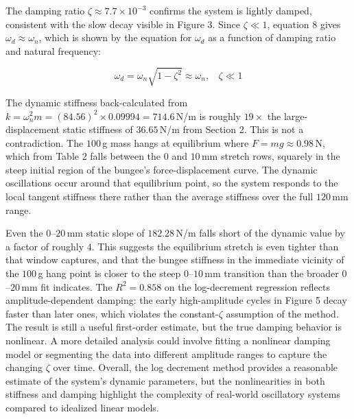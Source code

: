 \documentclass{article}
\begin{document}
The damping ratio $\zeta \approx 7.7 \times 10^{-3}$ confirms the system is lightly damped, consistent with the slow decay visible in Figure 3. Since $\zeta \ll 1$, equation 8 gives $\omega_d \approx \omega_n$, which is shown by the equation for $\omega_d$ as a function of damping ratio and natural frequency:

\begin{equation}
    \omega_d = \omega_n\sqrt{1-\zeta^2} \approx \omega_n,\:\:\:\:\zeta \ll 1
\end{equation}

\noindent The dynamic stiffness back-calculated from $k = \omega_n^2 m = (84.56)^2 \times 0.09994 = 714.6$\,N/m is roughly $19\times$ the large-displacement static stiffness of $36.65$\,N/m from Section 2. This is not a contradiction. The $100$\,g mass hangs at equilibrium where $F = mg \approx 0.98$\,N, which from Table 2 falls between the $0$ and $10$\,mm stretch rows, squarely in the steep initial region of the bungee's force-displacement curve. The dynamic oscillations occur around that equilibrium point, so the system responds to the local tangent stiffness there rather than the average stiffness over the full $120$\,mm range.

Even the $0$--$20$\,mm static slope of $182.28$\,N/m falls short of the dynamic value by a factor of roughly $4$. This suggests the equilibrium stretch is even tighter than that window captures, and that the bungee stiffness in the immediate vicinity of the $100$\,g hang point is closer to the steep $0$--$10$\,mm transition than the broader $0$--$20$\,mm fit indicates. The $R^2 = 0.858$ on the log-decrement regression reflects amplitude-dependent damping: the early high-amplitude cycles in Figure 5 decay faster than later ones, which violates the constant-$\zeta$ assumption of the method. The result is still a useful first-order estimate, but the true damping behavior is nonlinear. A more detailed analysis could involve fitting a nonlinear damping model or segmenting the data into different amplitude ranges to capture the changing $\zeta$ over time. Overall, the log decrement method provides a reasonable estimate of the system's dynamic parameters, but the nonlinearities in both stiffness and damping highlight the complexity of real-world oscillatory systems compared to idealized linear models.
\end{document}
